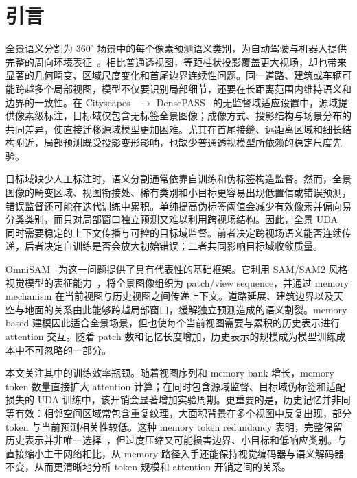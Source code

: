 \section{引言}
\label{sec:introduction}

全景语义分割为 $360^\circ$ 场景中的每个像素预测语义类别，为自动驾驶与机器人提供完整的周向环境表征~\cite{yang2021omnirange,ma2021densepass}。相比普通透视图，等距柱状投影覆盖更大视场，却也带来显著的几何畸变、区域尺度变化和首尾边界连续性问题。同一道路、建筑或车辆可能跨越多个局部视图，模型不仅要识别局部细节，还要在长距离范围内维持语义和边界的一致性。在 Cityscapes~\cite{cordts2016cityscapes} $\rightarrow$ DensePASS~\cite{ma2021densepass} 的无监督域适应设置中，源域提供像素级标注，目标域仅包含无标签全景图像；成像方式、投影结构与场景分布的共同差异，使直接迁移源域模型更加困难。尤其在首尾接缝、远距离区域和细长结构附近，局部预测既受投影变形影响，也缺少普通透视模型所依赖的稳定尺度先验。

目标域缺少人工标注时，语义分割通常依靠自训练和伪标签构造监督。然而，全景图像的畸变区域、视图衔接处、稀有类别和小目标更容易出现低置信或错误预测，错误监督还可能在迭代训练中累积。单纯提高伪标签阈值会减少有效像素并偏向易分类类别，而只对局部窗口独立预测又难以利用跨视场结构。因此，全景 UDA~\cite{zhang2022bending,zheng2023dppass,zheng2023datr,zhang2024goodsam} 同时需要稳定的上下文传播与可控的目标域监督。前者决定跨视场语义能否连续传递，后者决定自训练是否会放大初始错误；二者共同影响目标域收敛质量。

OmniSAM~\cite{zhong2025omnisam} 为这一问题提供了具有代表性的基础框架。它利用 SAM/SAM2 风格视觉模型的表征能力~\cite{kirillov2023segment,ravi2025sam2}，将全景图像组织为 patch/view sequence，并通过 memory mechanism 在当前视图与历史视图之间传递上下文。道路延展、建筑边界以及天空与地面的关系由此能够跨越局部窗口，缓解独立预测造成的语义割裂。memory-based 建模因此适合全景场景，但也使每个当前视图需要与累积的历史表示进行 attention 交互。随着 patch 数和记忆长度增加，历史表示的规模成为模型训练成本中不可忽略的一部分。

本文关注其中的训练效率瓶颈。随着视图序列和 memory bank 增长，memory token 数量直接扩大 attention 计算；在同时包含源域监督、目标域伪标签和适配损失的 UDA 训练中，该开销会显著增加实验周期。更重要的是，历史记忆并非同等有效：相邻空间区域常包含重复纹理，大面积背景在多个视图中反复出现，部分 token 与当前预测相关性较低。这种 memory token redundancy 表明，完整保留历史表示并非唯一选择~\cite{rao2021dynamicvit,bolya2023tome,lu2023tokensharing}，但过度压缩又可能损害边界、小目标和低响应类别。与直接缩小主干网络相比，从 memory 路径入手还能保持视觉编码器与语义解码器不变，从而更清晰地分析 token 规模和 attention 开销之间的关系。

